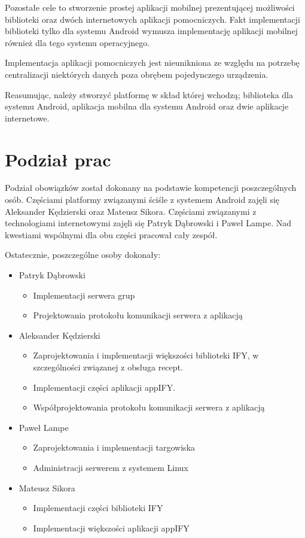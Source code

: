 \documentclass[11pt,a4paper,polish,thesis]{dcsbook}
\begin{document}
Pozostałe cele to stworzenie prostej aplikacji mobilnej prezentującej możliwości biblioteki oraz dwóch internetowych aplikacji pomocniczych. Fakt implementacji
biblioteki tylko dla systemu Android wymusza implementację aplikacji mobilnej również dla tego systemu operacyjnego.

Implementacja aplikacji pomocniczych jest nieunikniona ze względu na potrzebę centralizacji niektórych danych poza obrębem pojedynczego urządzenia.

Reasumując, należy stworzyć platformę w skład której wchodzą; biblioteka dla systemu Android, aplikacja mobilna dla systemu Android oraz dwie aplikacje internetowe.
\section{Podział prac}
Podział obowiązków został dokonany na podstawie kompetencji poszczególnych osób. Częściami platformy związanymi ściśle z systemem Android zajęli się Aleksander
Kędzierski oraz Mateusz Sikora. Częściami związanymi z technologiami internetowymi zajęli się Patryk Dąbrowski i Paweł Lampe. Nad kwestiami wspólnymi dla obu części
pracował cały zespół.

Ostatecznie, poszczególne osoby dokonały:
\begin{itemize}
\item Patryk Dąbrowski
\begin{itemize}
\item Implementacji serwera grup
\item Projektowania protokołu komunikacji serwera z aplikacją
\end{itemize}
\item Aleksander Kędzierski
\begin{itemize}
\item Zaprojektowania i implementacji większości biblioteki IFY, w szczególności związanej z obsługa recept.
\item Implementacji części aplikacji appIFY.
\item Współprojektowania protokołu komunikacji serwera z aplikacją
\end{itemize}
\item Paweł Lampe
\begin{itemize}
\item Zaprojektowania i implementacji targowiska
\item Administracji serwerem z systemem Linux
\end{itemize}
\item Mateusz Sikora
\begin{itemize}
\item Implementacji części biblioteki IFY
\item Implementacji większości aplikacji appIFY
\end{itemize}
\end{itemize}
\end{document}
